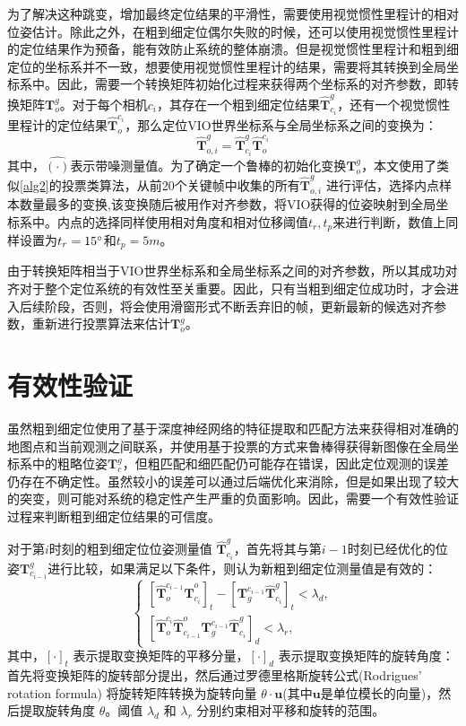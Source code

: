 为了解决这种跳变，增加最终定位结果的平滑性，需要使用视觉惯性里程计的相对位姿估计。除此之外，在粗到细定位偶尔失败的时候，还可以使用视觉惯性里程计的定位结果作为预备，能有效防止系统的整体崩溃。但是视觉惯性里程计和粗到细定位的坐标系并不一致，想要使用视觉惯性里程计的结果，需要将其转换到全局坐标系中。因此，需要一个转换矩阵初始化过程来获得两个坐标系的对齐参数，即转换矩阵$\symbf{T}_o^{g}$。对于每个相机$c_i$，其存在一个粗到细定位结果$\hat{\symbf{T}}^{g}_{c_i}$，还有一个视觉惯性里程计的定位结果$\hat{\symbf{T}}_{o}^{c_i}$，那么定位VIO世界坐标系与全局坐标系之间的变换为：
\begin{equation}
    \hat{\symbf{T}}_{o,i}^g = {\hat{\symbf{T}}^{g}_{c_i}} \hat{\symbf{T}}_{o}^{c_i}
\end{equation}
其中，${\hat{(\cdot)}}$表示带噪测量值。为了确定一个鲁棒的初始化变换$\symbf{T}_{o}^g$，本文使用了类似\ref{alg2}的投票类算法，从前20个关键帧中收集的所有$\hat{\symbf{T}}_{o,i}^g$ 进行评估，选择内点样本数量最多的变换,该变换随后被用作对齐参数，将VIO获得的位姿映射到全局坐标系中。内点的选择同样使用相对角度和相对位移阈值$t_r,t_p$来进行判断，数值上同样设置为$t_r=15\degree$和$t_p=5m$。

由于转换矩阵相当于VIO世界坐标系和全局坐标系之间的对齐参数，所以其成功对齐对于整个定位系统的有效性至关重要。因此，只有当粗到细定位成功时，才会进入后续阶段，否则，将会使用滑窗形式不断丢弃旧的帧，更新最新的候选对齐参数，重新进行投票算法来估计$\symbf{T}_o^{g}$。

\section{有效性验证}
虽然粗到细定位使用了基于深度神经网络的特征提取和匹配方法来获得相对准确的地图点和当前观测之间联系，并使用基于投票的方式来鲁棒得获得新图像在全局坐标系中的粗略位姿$\symbf{T}_{c}^g$，但粗匹配和细匹配仍可能存在错误，因此定位观测的误差仍存在不确定性。虽然较小的误差可以通过后端优化来消除，但是如果出现了较大的突变，则可能对系统的稳定性产生严重的负面影响。因此，需要一个有效性验证过程来判断粗到细定位结果的可信度。

对于第$i$时刻的粗到细定位位姿测量值 ${\hat{\symbf{T}}^{g}_{c_i}}$，首先将其与第$i-1$时刻已经优化的位姿${\symbf{T}}^{g}_{c_{i-1}}$进行比较，如果满足以下条件，则认为新粗到细定位测量值是有效的：
\begin{equation}
\label{eq:check}
\begin{cases}
    [\hat{\symbf{T}}_{o}^{c_{i-1}}\hat{\symbf{T}}^{o}_{c_i}]_{t} - [\symbf{T}_{g}^{c_{i-1}}\hat{\symbf{T}}^{g}_{c_i}]_{t} < \lambda_{d}, \\
    [\hat{\symbf{T}}^{c_i}_o \hat{\symbf{T}}_{c_{i-1}}^o \symbf{T}^{c_{i-1}}_g \hat{\symbf{T}}_{c_{i}}^g]_{d} < \lambda_{r},
\end{cases}
\end{equation}
其中，$[\cdot]_{t}$ 表示提取变换矩阵的平移分量，$[\cdot]_{d}$ 表示提取变换矩阵的旋转角度：首先将变换矩阵的旋转部分提出，然后通过罗德里格斯旋转公式(Rodrigues' rotation formula)\cite{dai2015euler} 将旋转矩阵转换为旋转向量 $\theta \cdot \symbf{u}$(其中$\symbf{u}$是单位模长的向量)，然后提取旋转角度 $\theta$。阈值 $\lambda_{d}$ 和 $\lambda_{r}$ 分别约束相对平移和旋转的范围。

